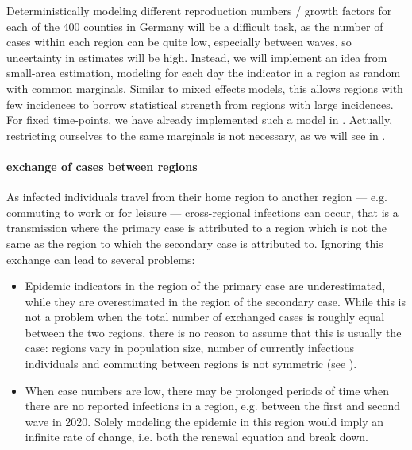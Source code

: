 Deterministically modeling different reproduction numbers / growth factors for each of the 400 counties in Germany will be a difficult task, as the number of cases within each region can be quite low, especially between waves, so uncertainty in estimates will be high. Instead, we will implement an idea from small-area estimation, modeling for each day the indicator in a region as random with common marginals. Similar to mixed effects models, this allows regions with few incidences to \glqq{}borrow statistical strength\grqq{} from regions with large incidences. For fixed time-points, we have already implemented such a model in \citep{Burgard2021Regional}. Actually, restricting ourselves to the same marginals is not necessary, as we will see in . 

\paragraph{exchange of cases between regions}
As infected individuals travel from their home region to another region --- e.g. commuting to work or for leisure --- cross-regional infections can occur, that is a transmission where the primary case is attributed to a region which is not the same as the region to which the secondary case is attributed to. Ignoring this exchange can lead to several problems:
\begin{itemize}
    \item Epidemic indicators in the region of the primary case are underestimated, while they are overestimated in the region of the secondary case. While this is not a problem when the total number of exchanged cases is roughly equal between the two regions, there is no reason to assume that this is usually the case: regions vary in population size, number of currently infectious individuals and commuting between regions is not symmetric (see ). 
    \item When case numbers are low, there may be prolonged periods of time when there are no reported infections in a region, e.g. between the first and second wave in 2020. Solely modeling the epidemic in this region would imply an infinite rate of change, i.e. both the renewal equation  and  break down.
\end{itemize}

